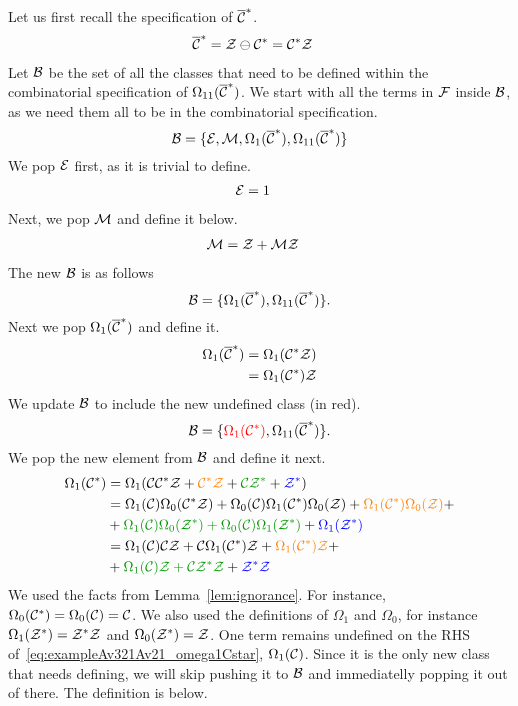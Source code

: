 \documentclass[12pt, a4paper, twoside]{report}
\begin{document}
Let us first recall the specification of $\overline{\mathcal{C}}^*$.
\begin{align*}
  \overline{\mathcal{C}}^* &= \mathcal{Z} \ominus \mathcal{C}^* = \mathcal{C}^*\mathcal{Z}
\end{align*}
Let $\mathcal{B}$ be the set of all the classes that need to be defined within the combinatorial specification of $\Omega_{11}(\overline{\mathcal{C}}^*)$. We start with all the terms in $\mathcal{F}$ inside $\mathcal{B}$, as we need them all to be in the combinatorial specification.
$$\mathcal{B} = \{\mathcal{E}, \mathcal{M}, \Omega_1(\overline{\mathcal{C}}^*), \Omega_{11}(\overline{\mathcal{C}}^*)\}$$
We pop $\mathcal{E}$ first, as it is trivial to define.
\begin{align}
  \mathcal{E} &= 1
        \label{eq:exampleAv321Av21_E}
\end{align}
Next, we pop $\mathcal{M}$ and define it below.
\begin{align}
  \mathcal{M} &= \mathcal{Z} + \mathcal{M}\mathcal{Z}
       \label{eq:exampleAv321Av21_M}
\end{align}
The new $\mathcal{B}$ is as follows
$$\mathcal{B} = \{\Omega_1(\overline{\mathcal{C}}^*), \Omega_{11}(\overline{\mathcal{C}}^*)\}.$$
Next we pop $\Omega_1(\overline{\mathcal{C}}^*)$ and define it.
\begin{align}
  \begin{aligned}
    \Omega_1(\overline{\mathcal{C}}^*) &= \Omega_1(\mathcal{C}^*\mathcal{Z})\\
    &= \Omega_1(\mathcal{C}^*)\mathcal{Z}
  \end{aligned}
  \label{eq:exampleAv321Av21_omega1barCstar}
\end{align}
We update $\mathcal{B}$ to include the new undefined class (in red).
$$\mathcal{B} = \{\textcolor{red}{\Omega_1(\mathcal{C}^*)}, \Omega_{11}(\overline{\mathcal{C}}^*)\}.$$
We pop the new element from $\mathcal{B}$ and define it next.
\begin{align}
  \begin{aligned}
    \Omega_1(\Cstar) &= \Omega_1(\C\Cstar\Z + \textcolor{orange}{\Cstar\Z} + \textcolor{green}{\C\Z^*} + \textcolor{blue}{\Z^*})\\
    &= \Omega_1(\C)\Omega_0(\Cstar\Z) + \Omega_0(\C)\Omega_1(\Cstar)\Omega_0(\Z) + \textcolor{orange}{\Omega_1(\Cstar)\Omega_0(\Z)} +\\
    &+\textcolor{green}{\Omega_1(\C)\Omega_0(\Z^*) + \Omega_0(\C)\Omega_1(\Z^*)} + \textcolor{blue}{\Omega_1(\Zstar)}\\
    &= \Omega_1(\C)\C\Z + \C\Omega_1(\Cstar)\Z + \textcolor{orange}{\Omega_1(\Cstar)\Z} +\\
    &+\textcolor{green}{\Omega_1(\C)\Z + \C\Z^*\Z} + \textcolor{blue}{\Zstar\Z}
  \end{aligned}
  \label{eq:exampleAv321Av21_omega1Cstar}
\end{align}
We used the facts from Lemma~\ref{lem:ignorance}. For instance, $\Omega_0(\mathcal{C}^*) = \Omega_0(\mathcal{C}) = \mathcal{C}$. We also used the definitions of $\Omega_1$ and $\Omega_0$, for instance $\Omega_1(\mathcal{Z}^*) = \mathcal{Z}^*\mathcal{Z}$ and $\Omega_0(\mathcal{Z}^*) = \mathcal{Z}$. One term remains undefined on the RHS of~\eqref{eq:exampleAv321Av21_omega1Cstar}, $\Omega_1(\mathcal{C})$. Since it is the only new class that needs defining, we will skip pushing it to $\mathcal{B}$ and immediatelly popping it out of there. The definition is below.
\end{document}

